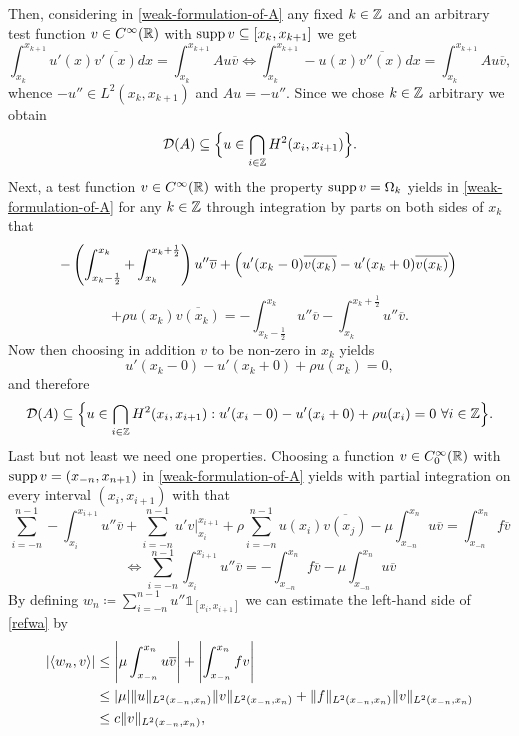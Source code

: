 Then, considering in \eqref{weak-formulation-of-A} any fixed $k \in \mathbb{Z}$ and an arbitrary test function $v \in C^{\infty}(\mathbb{R})$ with $\operatorname{supp} v \subseteq [x_{k}, x_{k+1}]$ we get 
	\[ \int_{x_{k}}^{x_{k + 1}} u'(x) \overline{v'(x)} dx = \int_{x_{k}}^{x_{k+1}} A u  \overline{v} \iff \int_{x_{k}}^{x_{k+1}} - u(x) \overline{v''(x)} dx = \int_{x_{k}}^{x_{k+1}} A u \overline{v}, \]
whence $- u'' \in L^{2}(x_{k}, x_{k + 1})$ and $A u = - u''$. Since we chose $k \in \mathbb{Z}$  arbitrary we obtain
	$$ \mathcal{D}(A) \subseteq \Big\{ u \in \bigcap_{i \in \mathbb{Z}} H^{2}(x_{i}, x_{i+1}) \Big\}. $$
Next, a test function $v \in C^{\infty}(\mathbb{R})$ with the property $\operatorname{supp} v = \Omega_{k}$ yields in \eqref{weak-formulation-of-A} for any $k \in \mathbb{Z}$ through integration by parts on both sides of $x_{k}$ that
	\[ -\left( \int_{x_{k}-\frac{1}{2}}^{x_{k}} + \int_{x_{k}}^{x_{k} + \frac{1}{2}}\right) u'' \overline{v} + \left( u'(x_{k}-0) \overline{v(x_{k})} - u'(x_{k} + 0) \overline{v(x_{k})} \right) \\ \]
	\[ +  \rho u(x_{k})\overline{v(x_{k})} = - \int_{x_{k} - \frac{1}{2}}^{x_{k}} u'' \overline{v} - \int_{x_{k}}^{x_{k} + \frac{1}{2}} u'' \overline{v}. \]
Now then choosing in addition $v$ to be non-zero in $x_{k}$ yields 
	\[ u'(x_{k}-0) - u'(x_{k}+0) + \rho u(x_{k}) = 0, \]
and therefore
	\begin{equation}
		\mathcal{D}(A) \subseteq \Big\{ u \in \bigcap_{i \in \mathbb{Z}} H^{2}(x_{i}, x_{i+1}) : u'(x_{i} - 0) - u'(x_{i} + 0) + \rho u(x_{i}) = 0 ~\forall i \in \mathbb{Z} \Big\}.
	\end{equation} 
Last but not least we need one properties. Choosing a function $v \in C_{0}^{\infty}(\mathbb{R})$ with $\operatorname{supp} v = (x_{-n}, x_{n+1})$ in \eqref{weak-formulation-of-A} yields with partial integration on every interval $(x_{i}, x_{i+1})$ with that
\[ \sum_{i=-n}^{n-1} -\int_{x_{i}}^{x_{i+1}} u'' \overline{v} + \sum_{i=-n}^{n-1} u' v \Big|_{x_{i}}^{x_{i+1}} + \rho \sum_{i=-n}^{n-1} u(x_{i}) \overline{v(x_{j})} - \mu \int_{x_{-n}}^{x_{n}} u \overline{v} = \int_{x_{-n}}^{x_{n}} f \overline{v} \]
\begin{equation} 
	\iff \sum_{i=-n}^{n-1} \int_{x_{i}}^{x_{i+1}} u'' \overline{v} = - \int_{x_{-n}}^{x_{n}} f \overline{v} - \mu \int_{x_{-n}}^{x_{n}} u \overline{v} \label{refwa}
\end{equation} 
By defining $w_{n} \coloneqq \sum_{i=-n}^{n-1} u'' \mathds{1}_{[x_{i}, x_{i+1}]}$ we can estimate the left-hand side of \eqref{refwa} by
\begin{align}
	\left| \langle w_{n}, v \rangle \right| & \leq \left| \mu \int_{x_{-n}}^{x_{n}} u \overline{v} \right| + \left| \int_{x_{-n}}^{x_{n}} f v \right| \notag \\
		& \leq |\mu| \|u\|_{L^{2}(x_{-n}, x_{n})} \|v\|_{L^{2}(x_{-n}, x_{n})} + \|f\|_{L^{2}(x_{-n}, x_{n})} \|v\|_{L^{2}(x_{-n}, x_{n})} \notag \\
		& \leq c \|v\|_{L^{2}(x_{-n}, x_{n})}, \label{refwa2}
\end{align}

